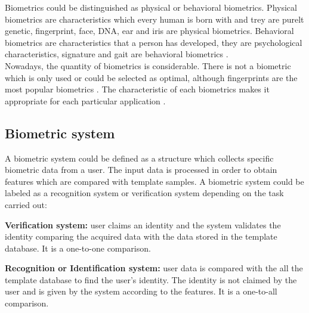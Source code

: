 Biometrics could be distinguished as physical or behavioral biometrics. Physical biometrics are characteristics which every human is born with and trey are purelt genetic, fingerprint, face, DNA, ear and iris are physical biometrics. Behavioral biometrics are characteristics that a person has developed, they are  psychological characteristics, signature and gait are behavioral biometrics \cite{biometrics_beha}.\\

Nowadays, the quantity of biometrics is considerable. There is not a biometric which is only used or could be selected as optimal, although fingerprints are the most popular biometrics \cite{2d_3d_face}. The characteristic of each biometrics makes it appropriate for each particular application \cite{Intro_biometrics}.%



\subsection{Biometric system}
A biometric system could be defined as a structure which collects specific biometric data from a user. The input data is processed in order to obtain features which are compared with template samples. A biometric system could be labeled as a recognition system or verification system depending on the task carried out\cite{Intro_biometrics2}:
\begin{description}[itemsep=2pt,topsep=8pt,parsep=0pt,partopsep=20pt]
\item \textbf{Verification system:} user claims an identity and the system validates the identity comparing the acquired data with the data stored in the template database. It is a one-to-one comparison.
\item \textbf{Recognition or Identification system:} user data is compared with the all the template database to find the user's identity. The identity is not claimed by the user and is given by the system according to the features. It is a one-to-all comparison.
\end{description}

